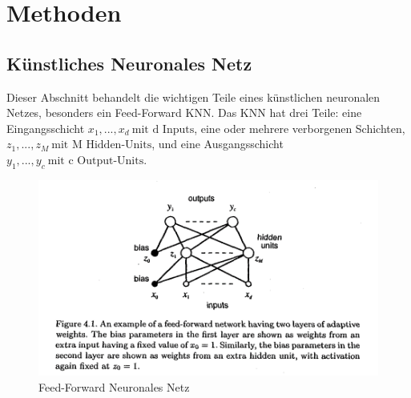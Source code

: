 \documentclass[12pt]{article}
\begin{document}
    \section{Methoden}

        \subsection{Künstliches Neuronales Netz}


            Dieser Abschnitt behandelt die wichtigen Teile eines künstlichen neuronalen Netzes, 
            besonders ein Feed-Forward KNN. Das KNN hat drei Teile: 
            eine Eingangsschicht \( x_1, ..., x_d \ \textrm{mit d Inputs} \),
            eine oder mehrere verborgenen Schichten, \( z_1, ..., z_M \ \textrm{mit M Hidden-Units} \),
            und eine Ausgangsschicht \( y_1, ..., y_c \ \textrm{mit c Output-Units} \).
            
            \begin{figure}[htp]
            
                \begin{center}

                    \includegraphics[scale=1]{neuronales-netz-bishop.png}
                    \caption{Feed-Forward Neuronales Netz \cite{bishop1995}}
        
                \end{center}
                
            \end{figure}
        
\end{document}
